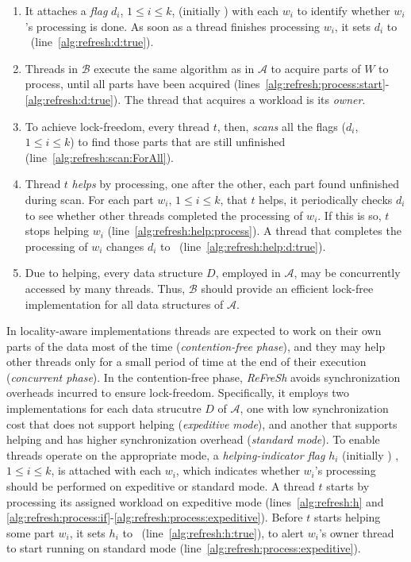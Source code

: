 \newpage

\begin{enumerate}
    \item It attaches a {\em flag} $d_i$, $1 \leq i \leq k$, (initially \False)  
    with each $w_i$ to identify whether $w_i$'s processing is done.  
    As soon as a thread finishes processing $w_i$, it sets $d_i$ to \True\ (line~\ref{alg:refresh:d:true}).  

    \item Threads in $\mathcal{B}$ execute the same algorithm as in $\mathcal{A}$ to acquire parts of $W$ to process,  
    until all parts have been acquired (lines~\ref{alg:refresh:process:start}-\ref{alg:refresh:d:true}).  
    The thread that acquires a workload is its {\em owner}.  

    \item To achieve lock-freedom, every thread $t$, then, {\em scans} all the flags ($d_i$, $1 \leq i \leq k$)  
    to find those parts that are still unfinished (line~\ref{alg:refresh:scan:ForAll}).  

    \item Thread $t$ {\em helps} by processing, one after the other, each part found unfinished during scan.  
    For each part $w_i$, $1 \leq i \leq k$, that $t$ helps, it periodically checks $d_i$  
    to see whether other threads completed the processing of $w_i$. If this is so,  
    $t$ stops helping $w_i$ (line~\ref{alg:refresh:help:process}).  
    A thread that completes the processing of $w_i$ changes $d_i$ to \True\ (line~\ref{alg:refresh:help:d:true}).  

    \item Due to helping, every data structure $D$, employed in $\mathcal{A}$, may be  
    concurrently accessed by many threads. Thus, $\mathcal{B}$ should provide an efficient  
    lock-free implementation for all data structures of $\mathcal{A}$.  
\end{enumerate}


In locality-aware implementations threads are expected to work
on their own parts of the data most of the time ({\em contention-free phase}), and they
may help other threads only for a small period of time at the end of their execution
({\em concurrent phase}).
In the contention-free phase, \textit{ReFreSh} avoids synchronization overheads incurred to
ensure lock-freedom. 
Specifically, it employs two implementations for each data strucutre $D$ of  $\mathcal{A}$,
one with low synchronization cost that does not support helping ({\em expeditive mode}),
and another that supports helping and has higher synchronization overhead ({\em standard mode}).  
To enable threads operate on the appropriate mode,  a {\em helping-indicator flag} $h_i$ 
(initially \False) , $1 \leq i \leq k$, is attached with each $w_i$, which indicates whether 
$w_i$'s processing should be performed on expeditive or standard mode.
% 
A thread $t$ starts by processing its assigned workload 
on expeditive mode (lines~\ref{alg:refresh:h} and \ref{alg:refresh:process:if}-\ref{alg:refresh:process:expeditive}).
Before $t$ starts helping some part $w_i$, it sets $h_i$ to \True\ (line~\ref{alg:refresh:h:true}),
to alert $w_i$'s owner thread to start running on standard mode (line~\ref{alg:refresh:process:expeditive}).

